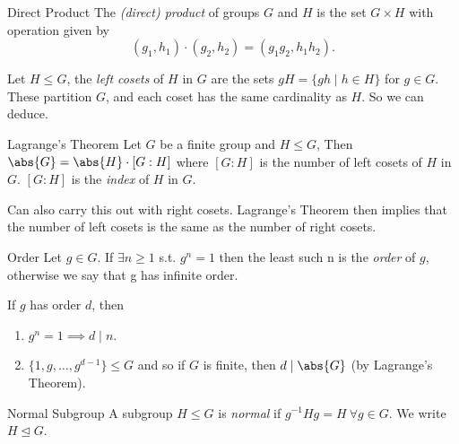 \begin{definition}{Direct Product}{}
The \textit{(direct) product} of groups \(G\) and \(H\) is the set \(G\times H\) with operation given by
\[
    (g_1, h_1) \cdot (g_2, h_2) = (g_1 g_2, h_1 h_2).
\] 
\end{definition}

Let \(H \leq G\), the \textit{left cosets} of \(H\) in \(G\) are the sets \(gH = \{gh\mid h \in H\}\) for \(g \in G\). These partition \(G\), and each coset has the same cardinality as \(H\). So we can deduce.

\begin{theorem}{Lagrange's Theorem}{}
    Let \(G\) be a finite group and \(H \leq  G\), Then \(\abs{G} = \abs{H} \cdot [G:H]\) where \([G:H]\) is the number of left cosets of \(H\) in \(G\). \([G:H]\) is the \textit{index} of \(H\) in \(G\).
\end{theorem}

\begin{remark}
    Can also carry this out with right cosets. Lagrange's Theorem then implies that the number of left cosets is the same as the number of right cosets.
\end{remark}

\begin{definition}{Order}{}
    Let \(g \in G\). If \(\exists n \geq  1\) s.t. \(g^n = 1\) then the least such n is the \textit{order} of \(g\), otherwise we say that g has infinite order.
\end{definition}

\begin{remark}
    If \(g\) has order \(d\), then
    \begin{enumerate}
        \item \(g^{n} = 1 \implies d \mid n\).
        \item \(\{1,g, \ldots , g^{d-1}\} \leq G\) and so if \(G\) is finite, then \(d\mid \abs{G} \) (by Lagrange's Theorem).
    \end{enumerate}
\end{remark}

\begin{definition}{Normal Subgroup}{}
    A subgroup \(H \leq  G\) is \textit{normal} if \(g^{-1}Hg = H~\forall g \in G\). We write \(H \trianglelefteq G\).
\end{definition}

